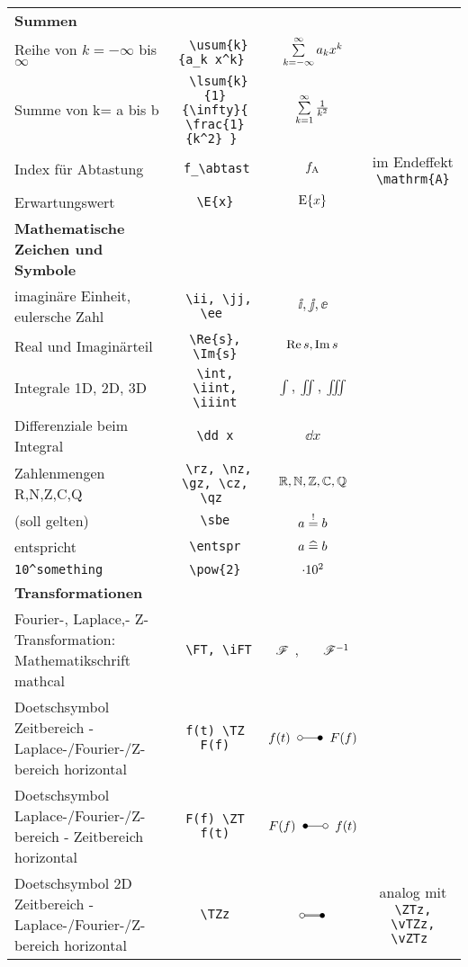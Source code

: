 \documentclass[a4paper]{article}
\begin{document}
\begin{landscape}
\begin{table}
\begin{tabular}{l | c | c | c }
		\textbf{Summen} &  &  &  \\
		Reihe von $k=-\infty$ bis $\infty$	&	\verb| \usum{k}{a_k x^k} |	&	$\sum\limits_{{k}=-\infty}^{\infty}{a_k x^k}$	& \\
		Summe von k= a bis b			&	\verb| \lsum{k}{1}{\infty}{ \frac{1}{k^2} } |	& $ \sum\limits_{{k}={1}}^{\infty}{ \frac{1}{k^2} } $ 	& \\
		
		Index für Abtastung	& \verb| f_\abtast |	& $f_{\mathrm{A}}$	& im Endeffekt \verb|\mathrm{A}|	\\
		Erwartungswert		& \verb| \E{x} |			&	$\mathrm{E}\!\left\{{x}\right\}$	&	\\
		
		\textbf{Mathematische Zeichen und Symbole}	& & &\\
		imaginäre Einheit, eulersche Zahl & \verb| \ii, \jj, \ee |	&      $\ii, \jj, \ee $ & 	\\ 
		Real und Imaginärteil	& \verb|\Re{s}, \Im{s}|		& 	$\operatorname{Re}{s}, \operatorname{Im}{s}$ & \\
		Integrale 1D, 2D, 3D & \verb|\int, \iint, \iiint|	&	$\int, \iint, \iiint$ & \\
		Differenziale beim Integral	&	\verb| \dd x |	&	$ \dd x $	& \\
		Zahlenmengen R,N,Z,C,Q		&	\verb| \rz, \nz, \gz, \cz, \qz |	&	$\mathbb{R}, \mathbb{N}, \mathbb{Z}, \mathbb{C}, \mathbb{Q}$ & \\
		(soll gelten)		&	\verb| \sbe |	& $a \stackrel{!}{=} b$	& \\
		entspricht		&	\verb| \entspr |	& $a \;\widehat =\; b $	&	\\
		\verb|10^something|			&	\verb| \pow{2} |	& $ \cdot 10^{2} $	&	\\
		
		\textbf{Transformationen} & & &\\
		Fourier-, Laplace,- Z-Transformation: Mathematikschrift mathcal		& \verb| \FT, \iFT|	& $\mathscr{F}$ , ~~  $\mathscr{F}^{-1}$& \\
		Doetschsymbol Zeitbereich - Laplace-/Fourier-/Z-bereich horizontal	& \verb|f(t) \TZ F(f)|			& $f(t) \TZ F(f)$	& \\
		Doetschsymbol Laplace-/Fourier-/Z-bereich - Zeitbereich horizontal	& \verb|F(f) \ZT f(t)|		& $F(f) \ZT f(t) $	& \\
		
		
		Doetschsymbol 2D Zeitbereich - Laplace-/Fourier-/Z-bereich horizontal	& \verb| \TZz | 		& $\TZz$	& analog mit \verb| \ZTz, \vTZz, \vZTz | \\
		
	\end{tabular}
\end{table}  
\end{landscape}
\end{document}
